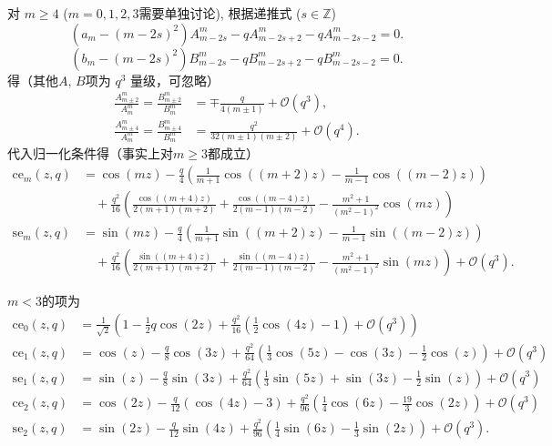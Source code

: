 对 \(m\geq4\) (\(m = 0, 1, 2, 3\)需要单独讨论), 根据递推式 (\(s \in \mathbb{Z}\))
\begin{equation*}
	(a_m - (m - 2s)^2) A_{m-2s}^m - q A_{m-2s+2}^m - q A_{m-2s-2}^m = 0.
\end{equation*}
\begin{equation*}
	(b_m - (m - 2s)^2) B_{m-2s}^m - q B_{m-2s+2}^m - q B_{m-2s-2}^m = 0.
\end{equation*}
得（其他\(A,\,B\)项为 \(q^3\) 量级，可忽略）
\begin{align*}
	\frac{A_{m\pm2}^m}{A_m^m} = \frac{B_{m\pm2}^m}{B_m^m} & = \mp \frac{q}{4(m\pm1)} + \mathcal{O}(q^3),       \\
	\frac{A_{m\pm4}^m}{A_m^m} = \frac{B_{m\pm4}^m}{B_m^m} & = \frac{q^2}{32(m\pm1)(m\pm2)} + \mathcal{O}(q^4).
\end{align*}
代入归一化条件得（事实上对\(m\geq3\)都成立）
\begin{align*}
	\mathrm{ce}_m(z, q) & = \cos(mz) - \frac{q}{4} \left( \frac{1}{m+1}\cos((m+2)z) - \frac{1}{m-1}\cos((m-2)z) \right)                                                                      \\
	                    & \quad+ \frac{q^2}{16} \left( \frac{\cos((m+4)z)}{2(m+1)(m+2)} + \frac{\cos((m-4)z)}{2(m-1)(m-2)} - \frac{m^2 + 1}{(m^2 - 1)^2}\cos(mz) \right)                     \\[4pt]
	\mathrm{se}_m(z, q) & = \sin(mz) - \frac{q}{4} \left( \frac{1}{m+1}\sin((m+2)z) - \frac{1}{m-1}\sin((m-2)z) \right)                                                                      \\
	                    & \quad+ \frac{q^2}{16} \left( \frac{\sin((m+4)z)}{2(m+1)(m+2)} + \frac{\sin((m-4)z)}{2(m-1)(m-2)} - \frac{m^2 + 1}{(m^2 - 1)^2}\sin(mz) \right) + \mathcal{O}(q^3).
\end{align*}

\(m<3\)的项为
\begin{align*}
	\mathrm{ce}_0(z, q) & = \frac{1}{\sqrt{2}} \left( 1 - \frac12 q\cos(2z) + \frac{q^2}{16} \left( \frac12 \cos(4z) - 1 \right) + \mathcal{O}(q^3) \right)                \\
	\mathrm{ce}_1(z, q) & = \cos(z) - \frac{q}{8}\cos(3z) + \frac{q^2}{64} \left( \frac13 \cos(5z) - \cos(3z) - \frac12 \cos(z) \right) + \mathcal{O}(q^3)                 \\
	\mathrm{se}_1(z, q) & = \sin(z) - \frac{q}{8}\sin(3z) + \frac{q^2}{64} \left( \frac13 \sin(5z) + \sin(3z) - \frac12 \sin(z) \right) + \mathcal{O}(q^3)                 \\
	\mathrm{ce}_2(z, q) & = \cos(2z) - \frac{q}{12} \left( \cos(4z) - 3 \right) + \frac{q^2}{96} \left( \frac14 \cos(6z) - \frac{19}{3}\cos(2z) \right) + \mathcal{O}(q^3) \\
	\mathrm{se}_2(z, q) & = \sin(2z) - \frac{q}{12}\sin(4z) + \frac{q^2}{96} \left( \frac14 \sin(6z) - \frac13 \sin(2z) \right) + \mathcal{O}(q^3).
\end{align*}

